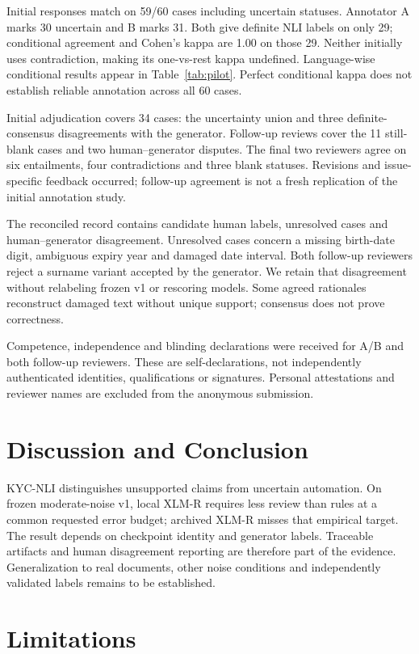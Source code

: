 \documentclass[11pt]{article}
\begin{document}
Initial responses match on 59/60 cases including uncertain statuses. Annotator
A marks 30 uncertain and B marks 31. Both give definite NLI labels on only 29;
conditional agreement and Cohen's kappa are 1.00 on those 29. Neither initially
uses contradiction, making its one-vs-rest kappa undefined. Language-wise
conditional results appear in Table~\ref{tab:pilot}. Perfect conditional kappa
does not establish reliable annotation across all 60 cases.

Initial adjudication covers 34 cases: the uncertainty union and three
definite-consensus disagreements with the generator. Follow-up reviews cover
the 11 still-blank cases and two human--generator disputes. The final two
reviewers agree on six entailments, four contradictions and three blank statuses.
Revisions and issue-specific feedback occurred; follow-up agreement is not a
fresh replication of the initial annotation study.

The reconciled record contains \PilotCandidates{} candidate human labels,
\PilotUnresolved{} unresolved cases and \PilotDisputes{} human--generator
disagreement. Unresolved cases concern a missing birth-date digit, ambiguous
expiry year and damaged date interval. Both follow-up reviewers reject a
surname variant accepted by the generator. We retain that disagreement without
relabeling frozen v1 or rescoring models. Some agreed rationales reconstruct
damaged text without unique support; consensus does not prove correctness.

Competence, independence and blinding declarations were received for A/B and
both follow-up reviewers. These are self-declarations, not independently
authenticated identities, qualifications or signatures. Personal attestations
and reviewer names are excluded from the anonymous submission.

\section{Discussion and Conclusion}
KYC-NLI distinguishes unsupported claims from uncertain automation. On frozen
moderate-noise v1, local XLM-R requires less review than rules at a common
requested error budget; archived XLM-R misses that empirical target. The result
depends on checkpoint identity and generator labels. Traceable artifacts and
human disagreement reporting are therefore part of the evidence. Generalization
to real documents, other noise conditions and independently validated labels
remains to be established.

\section*{Limitations}
\end{document}
